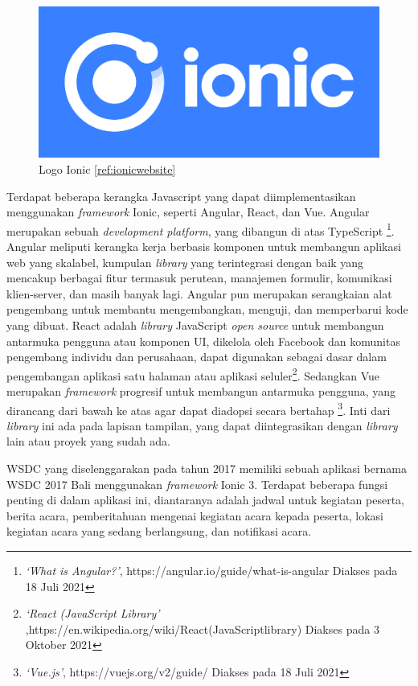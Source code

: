 \begin{figure}[H]
    \centering
    \includegraphics[scale=0.12]{Gambar/ionicLogo.png}
    \caption{Logo Ionic \ref{ref:ionicwebsite}}
    \label{fig:ionic-logo}
\end{figure}

\newpage

Terdapat beberapa kerangka Javascript yang dapat diimplementasikan menggunakan \textit{framework} Ionic, seperti Angular, React, dan Vue. Angular merupakan sebuah \textit{development platform}, yang dibangun di atas TypeScript \footnote{\textit{`What is Angular?'}, https://angular.io/guide/what-is-angular Diakses pada 18 Juli 2021}. Angular meliputi kerangka kerja berbasis komponen untuk membangun aplikasi web yang skalabel, kumpulan \textit{library} yang terintegrasi dengan baik yang mencakup berbagai fitur termasuk perutean, manajemen formulir, komunikasi klien-server, dan masih banyak lagi. Angular pun merupakan serangkaian alat pengembang untuk membantu mengembangkan, menguji, dan memperbarui kode yang dibuat. React adalah \textit{library} JavaScript {\it open source} untuk membangun antarmuka pengguna atau komponen UI, dikelola oleh Facebook dan komunitas pengembang individu dan perusahaan, dapat digunakan sebagai dasar dalam pengembangan aplikasi satu halaman atau aplikasi seluler\footnote{\textit{`React (JavaScript Library'} ,https://en.wikipedia.org/wiki/React\textunderscore(JavaScript\textunderscore library) Diakses pada 3 Oktober 2021}. Sedangkan Vue merupakan \textit{framework}  progresif untuk membangun antarmuka pengguna, yang dirancang dari bawah ke atas agar dapat diadopsi secara bertahap \footnote{\textit{`Vue.js'}, https://vuejs.org/v2/guide/ Diakses pada 18 Juli 2021}. Inti dari \textit{library} ini ada pada lapisan tampilan, yang dapat diintegrasikan dengan \textit{library} lain atau proyek yang sudah ada. 

WSDC yang diselenggarakan pada tahun 2017 memiliki sebuah aplikasi bernama WSDC 2017 Bali menggunakan \textit{framework} Ionic 3. Terdapat beberapa fungsi penting di dalam aplikasi ini, diantaranya adalah jadwal untuk kegiatan peserta, berita acara, pemberitahuan mengenai kegiatan acara kepada peserta, lokasi kegiatan acara yang sedang berlangsung, dan notifikasi acara. 

